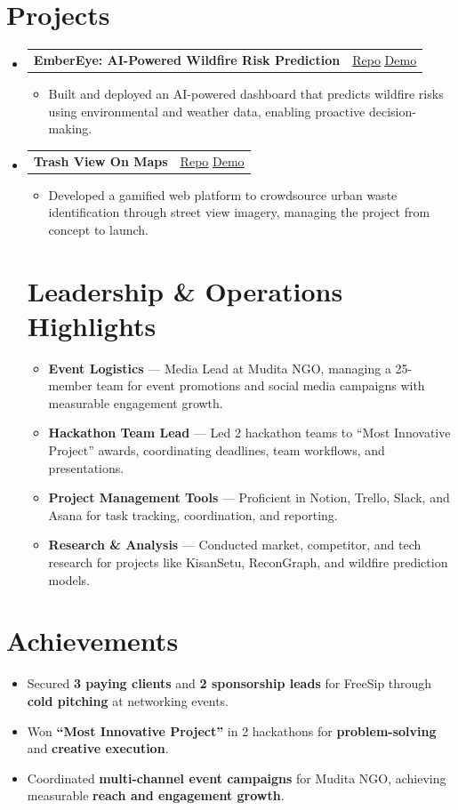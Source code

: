 \documentclass[letterpaper,11pt]{article}
\makeatletter
\newcommand{\resumeItem}[1]{
  \item\small{
    {#1 \vspace{-2pt}}
  }
}
\newcommand{\resumeProjectHeading}[2]{
    \item
    \begin{tabular*}{0.97\textwidth}{l@{\extracolsep{\fill}}r}
      \small#1 & #2 \\
    \end{tabular*}\vspace{-7pt}
}
\newcommand{\resumeSubHeadingListStart}{\begin{itemize}[leftmargin=0.15in, label={}]}
\newcommand{\resumeSubHeadingListEnd}{\end{itemize}}
\newcommand{\resumeItemListStart}{\begin{itemize}}
\newcommand{\resumeItemListEnd}{\end{itemize}\vspace{-5pt}}
\makeatother
\begin{document}
\section{Projects}
    \resumeSubHeadingListStart

\resumeProjectHeading
{\textbf{EmberEye: AI-Powered Wildfire Risk Prediction} }
{\faIcon{github}\href{https://github.com/aditzz073/ember-eye}{ \underline{Repo}}  \faIcon{link}\href{https://embereye-three.vercel.app/}{ \underline{Demo}}}
\resumeItemListStart
    \resumeItem{Built and deployed an AI-powered dashboard that predicts wildfire risks using environmental and weather data, enabling proactive decision-making.}
\resumeItemListEnd

\resumeProjectHeading
{\textbf{Trash View On Maps} }
{\faIcon{github}\href{https://github.com/aditzz073/Trash-view-on-maps}{ \underline{Repo}}  \faIcon{link}\href{https://trash-view-on-maps.vercel.app/}{ \underline{Demo}}}
\resumeItemListStart
    \resumeItem{Developed a gamified web platform to crowdsource urban waste identification through street view imagery, managing the project from concept to launch.}
\resumeItemListEnd
\vspace{-4.5pt}


\section{Leadership \& Operations Highlights}
\resumeItemListStart
    \resumeItem{\textbf{Event Logistics} — Media Lead at Mudita NGO, managing a 25-member team for event promotions and social media campaigns with measurable engagement growth.}
    \resumeItem{\textbf{Hackathon Team Lead} — Led 2 hackathon teams to “Most Innovative Project” awards, coordinating deadlines, team workflows, and presentations.}
    \resumeItem{\textbf{Project Management Tools} — Proficient in Notion, Trello, Slack, and Asana for task tracking, coordination, and reporting.}
    \resumeItem{\textbf{Research \& Analysis} — Conducted market, competitor, and tech research for projects like KisanSetu, ReconGraph, and wildfire prediction models.}
\resumeItemListEnd
    \resumeSubHeadingListEnd
\vspace{-9.5pt}


\section{Achievements}
\resumeItemListStart
  \resumeItem{Secured \textbf{3 paying clients} and \textbf{2 sponsorship leads} for FreeSip through \textbf{cold pitching} at networking events.}
  \resumeItem{Won \textbf{“Most Innovative Project”} in 2 hackathons for \textbf{problem-solving} and \textbf{creative execution}.}
  \resumeItem{Coordinated \textbf{multi-channel event campaigns} for Mudita NGO, achieving measurable \textbf{reach and engagement growth}.}
\resumeItemListEnd
\vspace{-0.2em}
\end{document}

